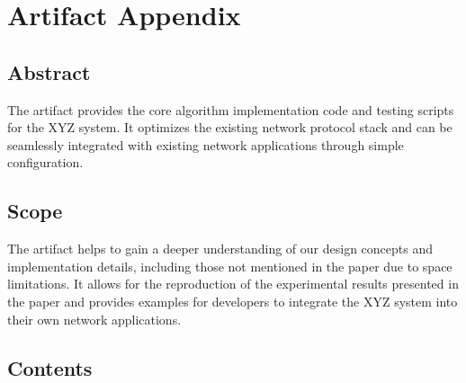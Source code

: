 %
%
%
%
%



% 



\appendix
\section{Artifact Appendix}
\label{sec:ae}

\subsection{Abstract}

The artifact provides the core algorithm implementation code and testing scripts for the XYZ system. It optimizes the existing network protocol stack and can be seamlessly integrated with existing network applications through simple configuration.

\subsection{Scope}

The artifact helps to gain a deeper understanding of our design concepts and implementation details, including those not mentioned in the paper due to space limitations. It allows for the reproduction of the experimental results presented in the paper and provides examples for developers to integrate the XYZ system into their own network applications.

\subsection{Contents}

